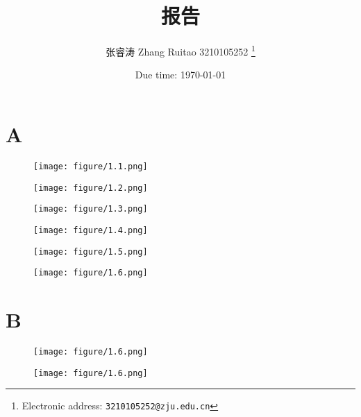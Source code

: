 \documentclass[a4paper]{article}
\begin{document}
\title{报告}

\author{张睿涛 Zhang Ruitao 3210105252
  \thanks{Electronic address: \texttt{3210105252@zju.edu.cn}}}

\date{Due time: \today}

\maketitle

\section*{A}
\begin{figure}[H]
    \centering
    \texttt{[image: figure/1.1.png]}
    \caption{}
    \label{fig:example}
\end{figure}

\begin{figure}[H]
    \centering
    \texttt{[image: figure/1.2.png]}
    \caption{}
    \label{fig:example}
\end{figure}
\begin{figure}[H]
    \centering
    \texttt{[image: figure/1.3.png]}
    \caption{}
    \label{fig:example}
\end{figure}
\begin{figure}[H]
    \centering
    \texttt{[image: figure/1.4.png]}
    \caption{}
    \label{fig:example}
\end{figure}
\begin{figure}[H]
    \centering
    \texttt{[image: figure/1.5.png]}
    \caption{}
    \label{fig:example}
\end{figure}
\begin{figure}[H]
    \centering
    \texttt{[image: figure/1.6.png]}
    \caption{}
    \label{fig:example}
\end{figure}
\section*{B}
\begin{figure}[H]
    \centering
    \texttt{[image: figure/1.6.png]}
    \caption{}
    \label{fig:example}
\end{figure}
\begin{figure}[H]
    \centering
    \texttt{[image: figure/1.6.png]}
    \caption{}
    \label{fig:example}
\end{figure}
\end{document}

